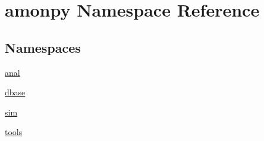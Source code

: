 \hypertarget{namespaceamonpy}{\section{amonpy Namespace Reference}
\label{namespaceamonpy}
}
\subsection*{Namespaces}
\begin{DoxyCompactItemize}
\item 
\hyperlink{namespaceamonpy_1_1anal}{anal}
\item 
\hyperlink{namespaceamonpy_1_1dbase}{dbase}
\item 
\hyperlink{namespaceamonpy_1_1sim}{sim}
\item 
\hyperlink{namespaceamonpy_1_1tools}{tools}
\end{DoxyCompactItemize}
